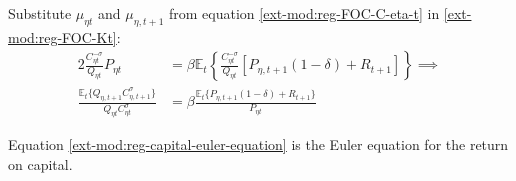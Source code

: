 \documentclass[../thesis.tex]{subfiles}
\begin{document}
Substitute $\mu_{\eta t}$ and $\mu_{\eta, t+1}$ from equation \ref{ext-mod:reg-FOC-C-eta-t} in \ref{ext-mod:reg-FOC-Kt}:
\begin{alignat}{2}
	\frac{C_{\eta t}^{-\sigma}}{Q_{\eta t}} P_{\eta t} &= \beta \mathbb{E}_{t} \left\{ \frac{C_{\eta t}^{-\sigma}}{Q_{\eta t}} [P_{\eta,t+1} (1 - \delta) + R_{t+1}] \right\} \implies \nonumber \\
	\frac{\mathbb{E}_{t} \{ Q_{\eta,t+1} C_{\eta,t+1}^{\sigma} \} }{ Q_{\eta t} C_{\eta t}^{\sigma} } &= \beta \frac{ \mathbb{E}_{t} \{ P_{\eta,t+1} (1 - \delta) + R_{t+1} \} }{P_{\eta t}} \label{ext-mod:reg-capital-euler-equation}
\end{alignat}


Equation \ref{ext-mod:reg-capital-euler-equation} is the Euler equation for the return on capital.

\begin{comment}

	Divide \ref{ext-mod:reg-capital-euler-equation} of region one by region two:
\begin{alignat}{2}
	\frac{\mathbb{E}_{t} \left\{Q_{1, t+1} C_{1, t+1}^{\sigma} \right\}}{\mathbb{E}_{t} \left\{Q_{2, t+1} C_{2, t+1}^{\sigma} \right\}} &= \frac{\beta (1 + R_{t}) Q_{1t} C_{1t}^{\sigma}}{\beta (1 + R_{t}) Q_{2t} C_{2t}^{\sigma}} \implies \nonumber \\
	\frac{\mathbb{E}_{t} \left\{ Q_{1, t+1} C_{1, t+1}^{\sigma} \right\}}{Q_{1t} C_{1t}^{\sigma}} &= \frac{\mathbb{E}_{t} \left\{ Q_{2, t+1} C_{2, t+1}^{\sigma} \right\}}{Q_{2t} C_{2t}^{\sigma}} \label{ext-mod:reg-bonds-euler-equation-2}
\end{alignat}
	
\end{comment}


\begin{comment}

	Define the regional consumer inflation gross rate:
	\begin{align}
		\pi_{\eta t} &= \frac{Q_{\eta t}}{Q_{\eta, t-1}} \label{ext-mod:consumer-inflation}
	\end{align}

	The relation between the nominal $R_{t}$ and the real $r_{t}$ interest rates is the gross inflation rate $\pi_{t}$, given by the Fisher equation. %
	\begin{align}
		\pi_{t} = \frac{(1 + R_{t})}{(1 + r_{t})}  \label{ext-mod:fisher-equation}
	\end{align}
	
\end{comment}
\end{document}
